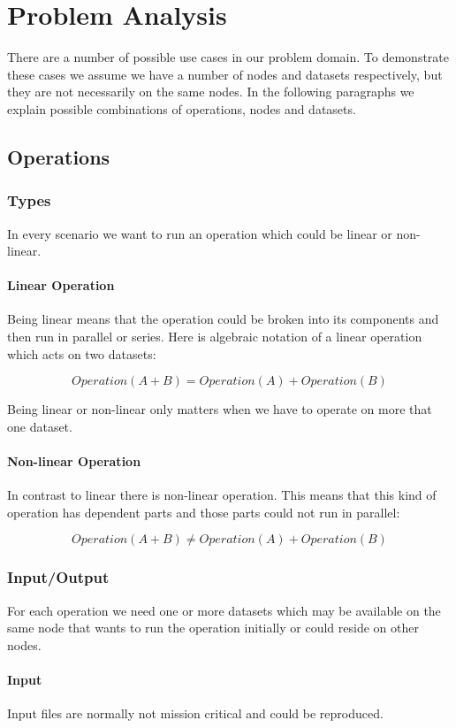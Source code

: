\chapter{Problem Analysis}
\label{cha:analysis}

There are a number of possible use cases in our problem domain. To demonstrate these cases we assume
we have a number of nodes and datasets respectively, but they are not necessarily on the same nodes.
In the following paragraphs we explain possible combinations of operations, nodes and datasets.

\section{Operations}
\subsection{Types}
In every scenario we want to run an operation which could be linear or non-linear.

\subsubsection{Linear Operation}
Being linear means that the operation
could be broken into its components and then run in parallel or series. Here is algebraic notation
of a linear operation which acts on two datasets:

\[ Operation(A + B) = Operation(A) + Operation(B) \]

Being linear or non-linear only matters when we have to operate on more that one dataset.

\subsubsection{Non-linear Operation}
In contrast to linear there is non-linear operation. This means that this kind of operation has dependent parts and
those parts could not run in parallel:

\[ Operation(A + B) \neq Operation(A) + Operation(B) \]

\subsection{Input/Output}
For each operation we need one or more datasets which may be available on the same node that wants to run the operation
initially or could reside on other nodes. 

\subsubsection{Input}
Input files are normally not mission critical and could be reproduced.

